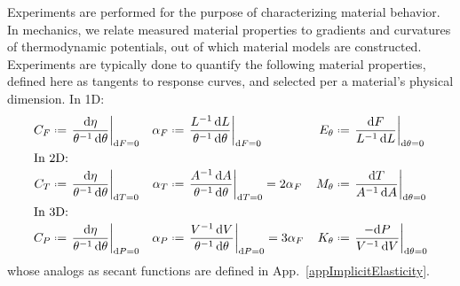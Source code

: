 Experiments are performed for the purpose of characterizing material behavior.  In mechanics, we relate measured material properties to gradients and curvatures of thermo\-dynamic potentials, out of which material models are constructed.  Experiments are typically done to quantify the following material properties, defined here as tangents to response curves, and selected per a material's physical dimension. 
\newline
In 1D:
\begin{subequations}
    \label{materialConstants}
    \begin{align}
    C_F & \defeq \left. \frac{\mathrm{d} \eta}
    {\theta^{-1} \, \mathrm{d}\theta} \right|_{\mathrm{d}F=0} & 
    \alpha_F & \defeq \left. \frac{L^{-1} \, \mathrm{d}L}
    {\theta^{-1} \, \mathrm{d} \theta} \right|_{\mathrm{d}F=0} &
    E_{\theta} & \defeq \left. \frac{\mathrm{d}F}
    {L^{-1} \, \mathrm{d}L} \right|_{\mathrm{d}\theta=0} \\
    \intertext{In 2D:}
    C_T & \defeq \left. \frac{\mathrm{d} \eta}
    {\theta^{-1} \, \mathrm{d}\theta} \right|_{\mathrm{d}T=0} & 
    \alpha_T & \defeq \left. \frac{A^{-1} \, \mathrm{d}A}
    {\theta^{-1} \, \mathrm{d} \theta} \right|_{\mathrm{d}T=0} =
    2 \alpha_F &
    M_{\theta} & \defeq \left. \frac{\mathrm{d}T}
    {A^{-1} \, \mathrm{d}A} \right|_{\mathrm{d}\theta=0} \\
    \intertext{In 3D:}
    C_P & \defeq \left. \frac{\mathrm{d} \eta}
    {\theta^{-1} \, \mathrm{d}\theta} \right|_{\mathrm{d}P=0} & 
    \alpha_P & \defeq \left. \frac{V^{-1} \, \mathrm{d}V}
    {\theta^{-1} \, \mathrm{d} \theta} \right|_{\mathrm{d}P=0} = 
    3 \alpha_F &
    K_{\theta} & \defeq \left. \frac{-\mathrm{d}P}
    {V^{-1} \, \mathrm{d}V} \right|_{\mathrm{d}\theta=0} 
    \end{align}
\end{subequations}
whose analogs as secant functions are defined in App.~\ref{appImplicitElasticity}.

